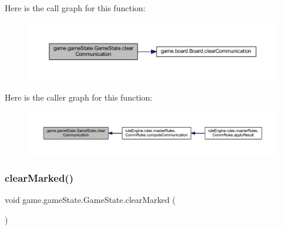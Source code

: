Here is the call graph for this function\+:
\nopagebreak
\begin{figure}[H]
\begin{center}
\leavevmode
\includegraphics[width=350pt]{classgame_1_1game_state_1_1_game_state_a41a6717791a72572de33f8e4fe2b956a_cgraph}
\end{center}
\end{figure}
Here is the caller graph for this function\+:
\nopagebreak
\begin{figure}[H]
\begin{center}
\leavevmode
\includegraphics[width=350pt]{classgame_1_1game_state_1_1_game_state_a41a6717791a72572de33f8e4fe2b956a_icgraph}
\end{center}
\end{figure}
\mbox{\label{classgame_1_1game_state_1_1_game_state_a8d1aba23400ae5b7cbd54af6514c83cc}} 
\subsubsection{\texorpdfstring{clear\+Marked()}{clearMarked()}}
{\footnotesize\ttfamily void game.\+game\+State.\+Game\+State.\+clear\+Marked (\begin{DoxyParamCaption}{ }\end{DoxyParamCaption})\hspace{0.3cm}{\ttfamily [inline]}}

